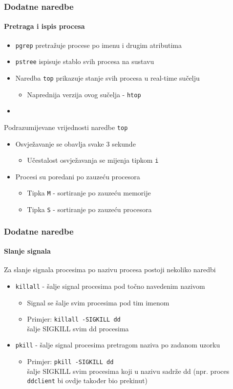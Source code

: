 \documentclass[table,usenames,dvipsnames]{beamer}
\newcommand{\shell}[1]{\texttt{#1}}
\begin{document}
\begin{frame}[t]
	\frametitle{Dodatne naredbe}
	\framesubtitle{Pretraga i ispis procesa}
	\begin{itemize}
		\item \shell{pgrep} pretražuje procese po imenu i drugim atributima
		\item \shell{pstree} ispisuje stablo svih procesa na sustavu
		\item Naredba \shell{top} prikazuje stanje svih procesa u real-time sučelju
		\begin{itemize}
			\item Naprednija verzija ovog sučelja - \shell{htop}
		\end{itemize}
		\item[]
	\end{itemize}
	
	Podrazumijevane vrijednosti naredbe \shell{top}
	\begin{itemize} 
		\item Osvježavanje se obavlja svake 3 sekunde
		\begin{itemize}
			\item Učestalost osvježavanja se mijenja tipkom \shell{i}
		\end{itemize}
		\item Procesi su poredani po zauzeću procesora
		\begin{itemize}
			\item Tipka \shell{M} - sortiranje po zauzeću memorije
			\item Tipka \shell{S} - sortiranje po zauzeću procesora
		\end{itemize}
	\end{itemize}
\end{frame}

\begin{frame}[t]
	\frametitle{Dodatne naredbe}
	\framesubtitle{Slanje signala}
	Za slanje signala procesima po nazivu procesa postoji nekoliko naredbi
	\begin{itemize}
		\item \shell{killall} - šalje signal procesima pod točno navedenim nazivom
		\begin{itemize}
			\item Signal se šalje svim procesima pod tim imenom
			\item Primjer: \shell{killall -SIGKILL dd} \\ šalje SIGKILL svim dd procesima
		\end{itemize}
		\item \shell{pkill} - šalje signal procesima pretragom naziva po zadanom uzorku
		\begin{itemize}
			\item Primjer: \shell{pkill -SIGKILL dd} \\ šalje SIGKILL svim procesima koji u nazivu sadrže dd (npr. proces \shell{ddclient} bi ovdje također bio prekinut)
		\end{itemize}
	\end{itemize}
\end{frame}
\end{document}

